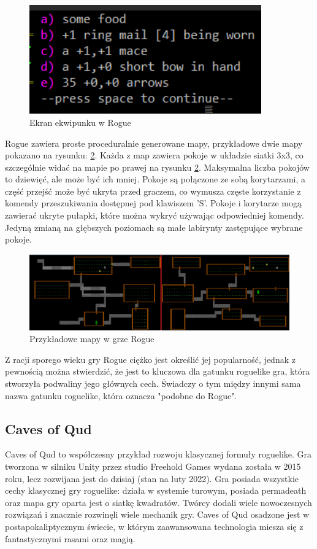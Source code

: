 \documentclass[12pt,twoside]{article}
\begin{document}
\FloatBarrier
\begin{figure}[ht]
	\centering
	\includegraphics[width=10cm]{images/rogue/scr2.png}
	\caption{Ekran ekwipunku w Rogue}
	\label{Rogue:scr2}
\end{figure}
\FloatBarrier

Rogue zawiera proste proceduralnie generowane mapy, przykładowe dwie mapy pokazano na rysunku: \ref{Rogue:scr3}. Każda z map zawiera pokoje w układzie siatki 3x3, co szczególnie widać na mapie po prawej na rysunku \ref{Rogue:scr3}. Maksymalna liczba pokojów to dziewięć, ale może być ich mniej. Pokoje są połączone ze sobą korytarzami, a część przejść może być ukryta przed graczem, co wymusza częste korzystanie z komendy przeszukiwania dostępnej pod klawiszem 'S'. Pokoje i korytarze mogą zawierać ukryte pułapki, które można wykryć używając odpowiedniej komendy. Jedyną zmianą na głębszych poziomach są małe labirynty zastępujące wybrane pokoje.

\FloatBarrier
\begin{figure}[ht]
	\centering
	\includegraphics[width=16cm]{images/rogue/scr3.png}
	\caption{Przykładowe mapy w grze Rogue}
	\label{Rogue:scr3}
\end{figure}
\FloatBarrier

Z racji sporego wieku gry Rogue ciężko jest określić jej popularność, jednak z pewnością można stwierdzić, że jest to kluczowa dla gatunku roguelike gra, która stworzyła podwaliny jego głównych cech. Świadczy o tym między innymi sama nazwa gatunku roguelike, która oznacza "podobne do Rogue".



\subsection{Caves of Qud}
Caves of Qud to współczesny przykład rozwoju klasycznej formuły roguelike. Gra tworzona w silniku Unity przez studio Freehold Games wydana została w 2015 roku, lecz rozwijana jest do dzisiaj (stan na luty 2022). Gra posiada wszystkie cechy klasycznej gry roguelike: działa w systemie turowym, posiada permadeath oraz mapa gry oparta jest o siatkę kwadratów. Twórcy dodali wiele nowoczesnych rozwiązań i znacznie rozwinęli wiele mechanik gry. Caves of Qud osadzone jest w postapokaliptycznym świecie, w którym zaawansowana technologia miesza się z fantastycznymi rasami oraz magią.
\end{document}

